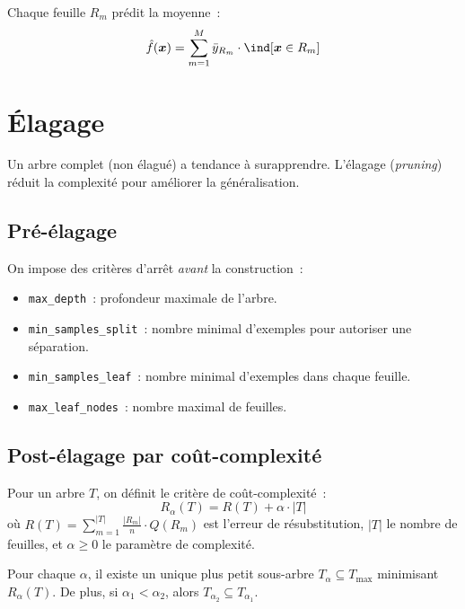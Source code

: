 Chaque feuille $R_m$ pr\'edit la moyenne~:
\begin{equation}
  \hat{f}(\bm{x}) = \sum_{m=1}^M \bar{y}_{R_m} \cdot \ind[\bm{x} \in R_m]
\end{equation}

\section{\'Elagage}
\label{sec:pruning}

Un arbre complet (non \'elagu\'e) a tendance \`a surapprendre. L'\'elagage
(\emph{pruning}) r\'eduit la complexit\'e pour am\'eliorer la
g\'en\'eralisation.

\subsection{Pr\'e-\'elagage}

On impose des crit\`eres d'arr\^et \emph{avant} la construction~:
\begin{itemize}
  \item \texttt{max\_depth}~: profondeur maximale de l'arbre.
  \item \texttt{min\_samples\_split}~: nombre minimal d'exemples pour
    autoriser une s\'eparation.
  \item \texttt{min\_samples\_leaf}~: nombre minimal d'exemples dans chaque
    feuille.
  \item \texttt{max\_leaf\_nodes}~: nombre maximal de feuilles.
\end{itemize}

\subsection{Post-\'elagage par co\^ut-complexit\'e}

\begin{definition}[Co\^ut-complexit\'e]
Pour un arbre $T$, on d\'efinit le crit\`ere de co\^ut-complexit\'e~:
\begin{equation}
  R_\alpha(T) = R(T) + \alpha \cdot |T|
  \label{eq:cost-complexity}
\end{equation}
o\`u $R(T) = \sum_{m=1}^{|T|} \frac{|R_m|}{n} \cdot Q(R_m)$ est l'erreur de
r\'esubstitution, $|T|$ le nombre de feuilles, et $\alpha \geq 0$ le
param\`etre de complexit\'e.
\end{definition}

\begin{theoreme}
Pour chaque $\alpha$, il existe un unique plus petit sous-arbre
$T_\alpha \subseteq T_{\max}$ minimisant $R_\alpha(T)$. De plus, si
$\alpha_1 < \alpha_2$, alors $T_{\alpha_2} \subseteq T_{\alpha_1}$.
\end{theoreme}

